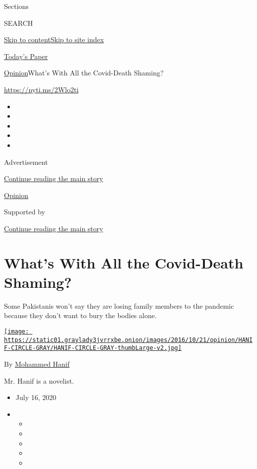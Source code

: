 Sections

SEARCH

\protect\hyperlink{site-content}{Skip to
content}\protect\hyperlink{site-index}{Skip to site index}

\href{https://myaccount.nytimes3xbfgragh.onion/auth/login?response_type=cookie\&client_id=vi}{}

\href{https://www.nytimes3xbfgragh.onion/section/todayspaper}{Today's
Paper}

\href{/section/opinion}{Opinion}\textbar{}What's With All the
Covid-Death Shaming?

\url{https://nyti.ms/2Wlo2ti}

\begin{itemize}
\item
\item
\item
\item
\item
\end{itemize}

Advertisement

\protect\hyperlink{after-top}{Continue reading the main story}

\href{/section/opinion}{Opinion}

Supported by

\protect\hyperlink{after-sponsor}{Continue reading the main story}

\hypertarget{whats-with-all-the-covid-death-shaming}{%
\section{What's With All the Covid-Death
Shaming?}\label{whats-with-all-the-covid-death-shaming}}

Some Pakistanis won't say they are losing family members to the pandemic
because they don't want to bury the bodies alone.

\href{https://www.nytimes3xbfgragh.onion/by/mohammed-hanif}{\texttt{[image: https://static01.graylady3jvrrxbe.onion/images/2016/10/21/opinion/HANIF-CIRCLE-GRAY/HANIF-CIRCLE-GRAY-thumbLarge-v2.jpg]}}

By \href{https://www.nytimes3xbfgragh.onion/by/mohammed-hanif}{Mohammed
Hanif}

Mr. Hanif is a novelist.

\begin{itemize}
\item
  July 16, 2020
\item
  \begin{itemize}
  \item
  \item
  \item
  \item
  \item
  \end{itemize}
\end{itemize}

